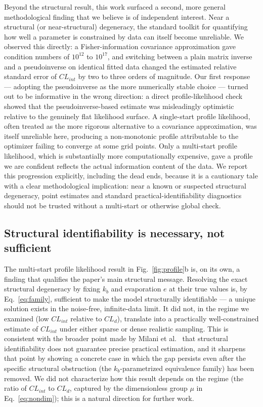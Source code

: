 Beyond the structural result, this work surfaced a second, more general methodological finding that we believe is of independent interest. Near a structural (or near-structural) degeneracy, the standard toolkit for quantifying how well a parameter is constrained by data can itself become unreliable. We observed this directly: a Fisher-information covariance approximation gave condition numbers of $10^{12}$ to $10^{17}$, and switching between a plain matrix inverse and a pseudoinverse on identical fitted data changed the estimated relative standard error of $CL_{int}$ by two to three orders of magnitude. Our first response --- adopting the pseudoinverse as the more numerically stable choice --- turned out to be informative in the wrong direction: a direct profile-likelihood check showed that the pseudoinverse-based estimate was misleadingly optimistic relative to the genuinely flat likelihood surface. A single-start profile likelihood, often treated as the more rigorous alternative to a covariance approximation, was itself unreliable here, producing a non-monotonic profile attributable to the optimizer failing to converge at some grid points. Only a multi-start profile likelihood, which is substantially more computationally expensive, gave a profile we are confident reflects the actual information content of the data. We report this progression explicitly, including the dead ends, because it is a cautionary tale with a clear methodological implication: near a known or suspected structural degeneracy, point estimates and standard practical-identifiability diagnostics should not be trusted without a multi-start or otherwise global check.

\subsection*{Structural identifiability is necessary, not sufficient}

The multi-start profile likelihood result in Fig.~\ref{fig:profile}b is, on its own, a finding that qualifies the paper's main structural message. Resolving the exact structural degeneracy by fixing $k_b$ and evaporation $e$ at their true values is, by Eq.~\eqref{eq:family}, sufficient to make the model structurally identifiable --- a unique solution exists in the noise-free, infinite-data limit. It did not, in the regime we examined (low $CL_{int}$ relative to $CL_d$), translate into a practically well-constrained estimate of $CL_{int}$ under either sparse or dense realistic sampling. This is consistent with the broader point made by Milani et al.\ \citep{milani2024} that structural identifiability does not guarantee precise practical estimation, and it sharpens that point by showing a concrete case in which the gap persists even after the specific structural obstruction (the $k_b$-parametrized equivalence family) has been removed. We did not characterize how this result depends on the regime (the ratio of $CL_{int}$ to $CL_d$, captured by the dimensionless group $\mu$ in Eq.~\eqref{eq:nondim}); this is a natural direction for further work.

